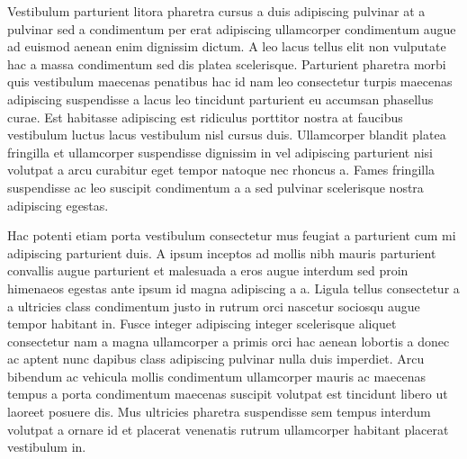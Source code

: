 Vestibulum parturient litora pharetra cursus a duis adipiscing pulvinar at a pulvinar sed a condimentum per erat adipiscing ullamcorper condimentum augue ad euismod aenean enim dignissim dictum. A leo lacus tellus elit non vulputate hac a massa condimentum sed dis platea scelerisque. Parturient pharetra morbi quis vestibulum maecenas penatibus hac id nam leo consectetur turpis maecenas adipiscing suspendisse a lacus leo tincidunt parturient eu accumsan phasellus curae. Est habitasse adipiscing est ridiculus porttitor nostra at faucibus vestibulum luctus lacus vestibulum nisl cursus duis. Ullamcorper blandit platea fringilla et ullamcorper suspendisse dignissim in vel adipiscing parturient nisi volutpat a arcu curabitur eget tempor natoque nec rhoncus a. Fames fringilla suspendisse ac leo suscipit condimentum a a sed pulvinar scelerisque nostra adipiscing egestas. 

Hac potenti etiam porta vestibulum consectetur mus feugiat a parturient cum mi adipiscing parturient duis. A ipsum inceptos ad mollis nibh mauris parturient convallis augue parturient et malesuada a eros augue interdum sed proin himenaeos egestas ante ipsum id magna adipiscing a a. Ligula tellus consectetur a a ultricies class condimentum justo in rutrum orci nascetur sociosqu augue tempor habitant in. Fusce integer adipiscing integer scelerisque aliquet consectetur nam a magna ullamcorper a primis orci hac aenean lobortis a donec ac aptent nunc dapibus class adipiscing pulvinar nulla duis imperdiet. Arcu bibendum ac vehicula mollis condimentum ullamcorper mauris ac maecenas tempus a porta condimentum maecenas suscipit volutpat est tincidunt libero ut laoreet posuere dis. Mus ultricies pharetra suspendisse sem tempus interdum volutpat a ornare id et placerat venenatis rutrum ullamcorper habitant placerat vestibulum in.